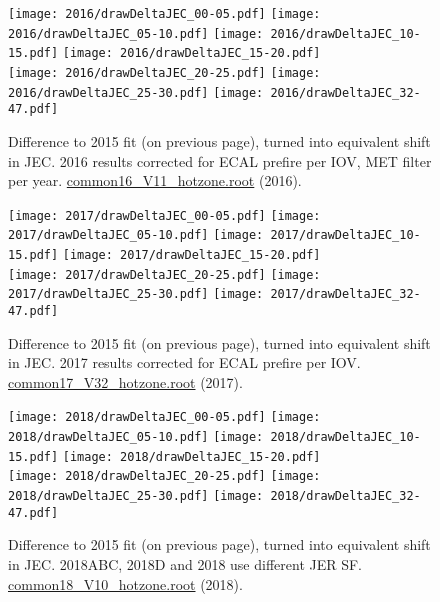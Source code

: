 \documentclass[landscape,10pt]{beamer} %
\begin{document}
\begin{figure}[p]
\centering
  \texttt{[image: 2016/drawDeltaJEC\_00-05.pdf]}
  \texttt{[image: 2016/drawDeltaJEC\_05-10.pdf]}
  \texttt{[image: 2016/drawDeltaJEC\_10-15.pdf]}
  \texttt{[image: 2016/drawDeltaJEC\_15-20.pdf]}\\
  \texttt{[image: 2016/drawDeltaJEC\_20-25.pdf]}
  \texttt{[image: 2016/drawDeltaJEC\_25-30.pdf]}
  \texttt{[image: 2016/drawDeltaJEC\_32-47.pdf]}
  \caption{Difference to 2015 fit (on previous page), turned into equivalent shift in JEC. 2016 results corrected for ECAL prefire per IOV, MET filter per year.
\href{https://gitlab.cern.ch/lamartik/combinationfiles/common16_V11_hotzone.root}{common16\_V11\_hotzone.root} (2016).}
\end{figure}

\begin{figure}[p]
\centering
  \texttt{[image: 2017/drawDeltaJEC\_00-05.pdf]}
  \texttt{[image: 2017/drawDeltaJEC\_05-10.pdf]}
  \texttt{[image: 2017/drawDeltaJEC\_10-15.pdf]}
  \texttt{[image: 2017/drawDeltaJEC\_15-20.pdf]}\\
  \texttt{[image: 2017/drawDeltaJEC\_20-25.pdf]}
  \texttt{[image: 2017/drawDeltaJEC\_25-30.pdf]}
  \texttt{[image: 2017/drawDeltaJEC\_32-47.pdf]}
  \caption{Difference to 2015 fit (on previous page), turned into equivalent shift in JEC. 2017 results corrected for ECAL prefire per IOV.
\href{https://gitlab.cern.ch/lamartik/combinationfiles/common17_V32_hotzone.root}{common17\_V32\_hotzone.root} (2017).}
\end{figure}

\begin{figure}[p]
\centering
  \texttt{[image: 2018/drawDeltaJEC\_00-05.pdf]}
  \texttt{[image: 2018/drawDeltaJEC\_05-10.pdf]}
  \texttt{[image: 2018/drawDeltaJEC\_10-15.pdf]}
  \texttt{[image: 2018/drawDeltaJEC\_15-20.pdf]}\\
  \texttt{[image: 2018/drawDeltaJEC\_20-25.pdf]}
  \texttt{[image: 2018/drawDeltaJEC\_25-30.pdf]}
  \texttt{[image: 2018/drawDeltaJEC\_32-47.pdf]}
  \caption{Difference to 2015 fit (on previous page), turned into equivalent shift in JEC. 2018ABC, 2018D and 2018 use different JER SF.
\href{https://gitlab.cern.ch/lamartik/combinationfiles/common18_V10_hotzone.root}{common18\_V10\_hotzone.root} (2018).}
\end{figure}
\end{document}
